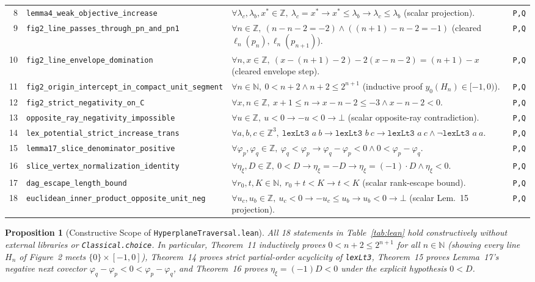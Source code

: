 \documentclass[10pt,twocolumn]{article}
\newtheorem{proposition}{Proposition}
\newcommand{\ZZ}{\mathbb{Z}}
\begin{document}
\begin{table}[t]
\begin{tabular}{@{}r l p{10.5cm} l@{}}
8 & \texttt{lemma4\_weak\_objective\_increase} & $\forall \lambda_c,\lambda_b,x^*\in\ZZ,\ \lambda_c = x^* \to x^* \le \lambda_b \to \lambda_c \le \lambda_b$ (scalar projection). & \texttt{P,Q} \\
9 & \texttt{fig2\_line\_passes\_through\_pn\_and\_pn1} & $\forall n\in\ZZ,\ (n - n - 2 = -2) \wedge ((n+1) - n - 2 = -1)$ (cleared $\ell_n(p_n), \ell_n(p_{n+1})$). & \texttt{P,Q} \\
10 & \texttt{fig2\_line\_envelope\_domination} & $\forall n,x\in\ZZ,\ (x-(n+1)-2) - 2(x-n-2) = (n+1)-x$ (cleared envelope step). & \texttt{P,Q} \\
11 & \texttt{fig2\_origin\_intercept\_in\_compact\_unit\_segment} & $\forall n\in\mathbb{N},\ 0 < n + 2 \wedge n + 2 \le 2^{n+1}$ (inductive proof $y_0(H_n)\in[-1,0)$). & \texttt{P,Q} \\
12 & \texttt{fig2\_strict\_negativity\_on\_C} & $\forall x,n\in\ZZ,\ x + 1 \le n \to x - n - 2 \le -3 \wedge x - n - 2 < 0$. & \texttt{P,Q} \\
13 & \texttt{opposite\_ray\_negativity\_impossible} & $\forall u\in\ZZ,\ u < 0 \to -u < 0 \to \bot$ (scalar opposite-ray contradiction). & \texttt{P,Q} \\
14 & \texttt{lex\_potential\_strict\_increase\_trans} & $\forall a,b,c\in\ZZ^3,\ \texttt{lexLt3 } a\ b \to \texttt{lexLt3 } b\ c \to \texttt{lexLt3 } a\ c \wedge \neg\texttt{lexLt3 } a\ a$. & \texttt{P,Q} \\
15 & \texttt{lemma17\_slice\_denominator\_positive} & $\forall \varphi_p,\varphi_q\in\ZZ,\ \varphi_q < \varphi_p \to \varphi_q - \varphi_p < 0 \wedge 0 < \varphi_p - \varphi_q$. & \texttt{P,Q} \\
16 & \texttt{slice\_vertex\_normalization\_identity} & $\forall \eta_\xi,D\in\ZZ,\ 0 < D \to \eta_\xi = -D \to \eta_\xi = (-1)\cdot D \wedge \eta_\xi < 0$. & \texttt{P,Q} \\
17 & \texttt{dag\_escape\_length\_bound} & $\forall r_0,t,K\in\mathbb{N},\ r_0 + t < K \to t < K$ (scalar rank-escape bound). & \texttt{P,Q} \\
18 & \texttt{euclidean\_inner\_product\_opposite\_unit\_neg} & $\forall u_c,u_b\in\ZZ,\ u_c < 0 \to -u_c \le u_b \to u_b < 0 \to \bot$ (scalar Lem.~15 projection). & \texttt{P,Q} \\
\bottomrule
\end{tabular}
\end{table}

\begin{proposition}[Constructive Scope of \texttt{HyperplaneTraversal.lean}]\label{prop:lean}
\normalfont All 18 statements in Table~\ref{tab:lean} hold constructively without external libraries or \texttt{Classical.choice}. In particular, Theorem~11 inductively proves $0 < n + 2 \le 2^{n+1}$ for all $n\in\mathbb{N}$ (showing every line $H_n$ of Figure~2 meets $\{0\}\times[-1,0]$), Theorem~14 proves strict partial-order acyclicity of \texttt{lexLt3}, Theorem~15 proves Lemma~17's negative next covector $\varphi_q - \varphi_p < 0 < \varphi_p - \varphi_q$, and Theorem~16 proves $\eta_\xi = (-1)D < 0$ under the explicit hypothesis $0 < D$.
\end{proposition}
\end{document}
